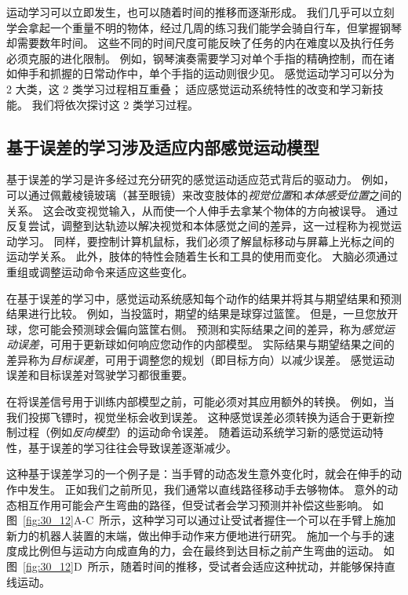 运动学习可以立即发生，也可以随着时间的推移而逐渐形成。
我们几乎可以立刻学会拿起一个重量不明的物体，经过几周的练习我们能学会骑自行车，但掌握钢琴却需要数年时间。
这些不同的时间尺度可能反映了任务的内在难度以及执行任务必须克服的进化限制。
例如，钢琴演奏需要学习对单个手指的精确控制，而在诸如伸手和抓握的日常动作中，单个手指的运动则很少见。
感觉运动学习可以分为 2 大类，这 2 类学习过程相互重叠；
适应感觉运动系统特性的改变和学习新技能。
我们将依次探讨这 2 类学习过程。



\subsection{基于误差的学习涉及适应内部感觉运动模型}

基于误差的学习是许多经过充分研究的感觉运动适应范式背后的驱动力。
例如，可以通过佩戴棱镜玻璃（甚至眼镜）来改变肢体的\textit{视觉位置}和\textit{本体感受位置}之间的关系。
这会改变视觉输入，从而使一个人伸手去拿某个物体的方向被误导。
通过反复尝试，调整到达轨迹以解决视觉和本体感觉之间的差异，这一过程称为视觉运动学习。
同样，要控制计算机鼠标，我们必须了解鼠标移动与屏幕上光标之间的运动学关系。
此外，肢体的特性会随着生长和工具的使用而变化。
大脑必须通过重组或调整运动命令来适应这些变化。


在基于误差的学习中，感觉运动系统感知每个动作的结果并将其与期望结果和预测结果进行比较。
例如，当投篮时，期望的结果是球穿过篮筐。
但是，一旦您放开球，您可能会预测球会偏向篮筐右侧。
预测和实际结果之间的差异，称为\textit{感觉运动误差}，可用于更新球如何响应您动作的内部模型。
实际结果与期望结果之间的差异称为\textit{目标误差}，可用于调整您的规划（即目标方向）以减少误差。
感觉运动误差和目标误差对驾驶学习都很重要。


在将误差信号用于训练内部模型之前，可能必须对其应用额外的转换。
例如，当我们投掷飞镖时，视觉坐标会收到误差。
这种感觉误差必须转换为适合于更新控制过程（例如\textit{反向模型}）的运动命令误差。
随着运动系统学习新的感觉运动特性，基于误差的学习往往会导致误差逐渐减少。


这种基于误差学习的一个例子是：当手臂的动态发生意外变化时，就会在伸手的动作中发生。
正如我们之前所见，我们通常以直线路径移动手去够物体。
意外的动态相互作用可能会产生弯曲的路径，但受试者会学习预测并补偿这些影响。
如图~\ref{fig:30_12}A-C~所示，这种学习可以通过让受试者握住一个可以在手臂上施加新力的机器人装置的末端，做出伸手动作来方便地进行研究。
施加一个与手的速度成比例但与运动方向成直角的力，会在最终到达目标之前产生弯曲的运动。
如图~\ref{fig:30_12}D~所示，随着时间的推移，受试者会适应这种扰动，并能够保持直线运动。


